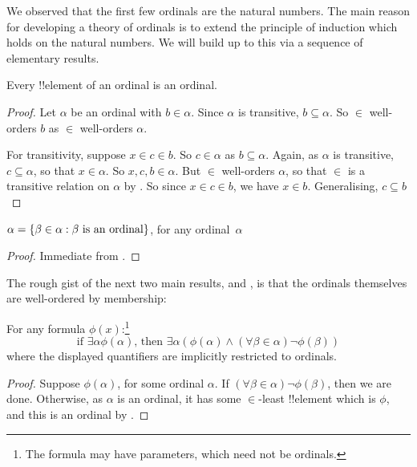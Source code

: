 \documentclass[../../../include/open-logic-section]{subfiles}
\begin{document}

We observed that the first few ordinals are the natural numbers. The
main reason for developing a theory of ordinals is to extend the
principle of induction which holds on the natural numbers. We will
build up to this via a sequence of elementary results.

\begin{lem}
Every !!{element} of an ordinal is an ordinal.
\end{lem}

\begin{proof}
Let $\alpha$ be an ordinal with $b \in \alpha$. Since $\alpha$ is
transitive, $b \subseteq \alpha$. So $\in$ well-orders $b$ as $\in$
well-orders $\alpha$.

For transitivity, suppose $x \in c \in b$. So $c \in \alpha$ as $b
\subseteq \alpha$. Again, as $\alpha$ is transitive, $c \subseteq
\alpha$, so that $x \in \alpha$. So $x, c, b \in \alpha$. But $\in$
well-orders $\alpha$, so that $\in$ is a transitive relation on
$\alpha$ by . So since $x
\in c \in b$, we have $x \in b$. Generalising, $c \subseteq b$
\end{proof}

\begin{cor}
$\alpha = \{ \beta \in \alpha : \beta \text{ is an ordinal} \}$, for
any ordinal~$\alpha$
\end{cor}

\begin{proof}
Immediate from .
\end{proof}

The rough gist of the next two main results,
 and , is that the
ordinals themselves are well-ordered by membership:

\begin{thm}
For any formula $\phi(x)$:\footnote{The formula may have parameters,
which need not be ordinals.} 	
\[
	\text{if }\exists \alpha \phi(\alpha)\text{, then }\exists \alpha(\phi(\alpha)
	\land  (\forall \beta \in \alpha) \lnot \phi(\beta))
\]
where the displayed quantifiers are implicitly restricted to ordinals.
\end{thm}

\begin{proof}
Suppose $\phi(\alpha)$, for some ordinal $\alpha$. If $ (\forall \beta
\in \alpha) \lnot \phi(\beta)$, then we are done. Otherwise, as
$\alpha$ is an ordinal, it has some $\in$-least !!{element} which is
$\phi$, and this is an ordinal by .
\end{proof}
\end{document}

